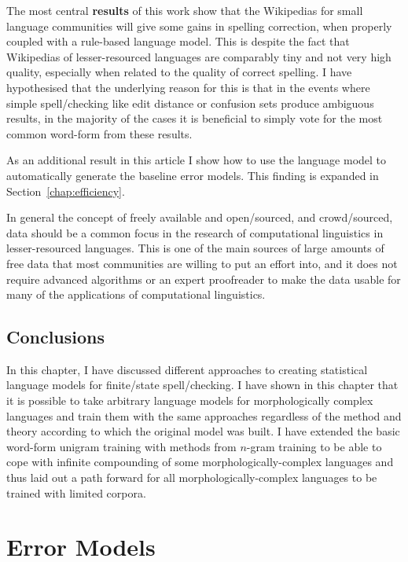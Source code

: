 \documentclass[officiallayout,final]{unihelcompling}
\begin{document}
The most central \textbf{results} of this work show that the Wikipedias for
small language communities will give some gains in spelling correction, when
properly coupled with a rule-based language model. This is despite the fact
that Wikipedias of lesser-resourced languages are comparably tiny and not very
high quality, especially when related to the quality of correct spelling.  I
have hypothesised that the underlying reason for this is that in the events
where simple spell\-/checking like edit distance or confusion sets produce
ambiguous results, in the majority of the cases it is beneficial to simply vote
for the most common word-form from these results.

As an additional result in this article I show how to use the language model to
automatically generate the baseline error models. This finding is expanded in
Section~\ref{chap:efficiency}.

In general the concept of freely available and open\-/sourced, and
crowd\-/sourced, data should be a common focus in the research of computational
linguistics in lesser-resourced languages. This is one of the main sources of
large amounts of free data that most communities are willing to put an effort
into, and it does not require advanced algorithms or an expert proofreader to
make the data usable for many of the applications of computational linguistics.

\section{Conclusions}

In this chapter, I have discussed different approaches to creating
statistical language models for finite\-/state spell\-/checking. I have
shown in this chapter that it is possible to take arbitrary language models for
morphologically complex languages and train them with the same approaches
regardless of the method and theory according to which the original model was
built. I have extended the basic word-form unigram training with methods from
\(n\)-gram training to be able to cope with infinite compounding of some
morphologically-complex languages and thus laid out a path forward for all
morphologically-complex languages to be trained with limited corpora.


\chapter{Error Models}
\label{chap:error-models}
\end{document}
